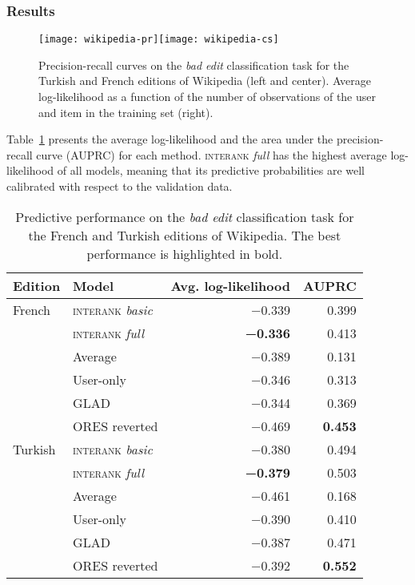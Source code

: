 \documentclass[format=sigconf]{acmart}
\begin{document}
\subsubsection{Results}

\begin{figure*}
\texttt{[image: wikipedia-pr]}\hfill\texttt{[image: wikipedia-cs]}
\caption{Precision-recall curves on the \emph{bad edit} classification task for the Turkish and French editions of Wikipedia (left and center).
Average log-likelihood as a function of the number of observations of the user and item in the training set (right).}
\label{fig:wikipr}
\end{figure*}

Table~\ref{tab:wikiperf} presents the average log-likelihood and the area under the precision-recall curve (AUPRC) for each method.
\textsc{interank} \emph{full} has the highest average log-likelihood of all models, meaning that its predictive probabilities are well calibrated with respect to the validation data.

\begin{table}
  \caption{Predictive performance on the \emph{bad edit} classification task for the French and Turkish editions of Wikipedia.
The best performance is highlighted in bold.}
  \label{tab:wikiperf}
  \begin{tabular}{llrr}
    \toprule
    Edition        & Model                          & Avg. log-likelihood   & AUPRC \\
    \midrule
    French         & \textsc{interank} \emph{basic} & \num{-0.339}          & \num{0.399}  \\
                   & \textsc{interank} \emph{full}  & \textbf{\num{-0.336}} & \num{0.413}  \\
    \addlinespace
                   & Average                        & \num{-0.389}          & \num{0.131}  \\
                   & User-only                      & \num{-0.346}          & \num{0.313}  \\
                   & GLAD                           & \num{-0.344}          & \num{0.369} \\
                   & ORES reverted                  & \num{-0.469}          & \textbf{\num{0.453}} \\
    \midrule
    Turkish        & \textsc{interank} \emph{basic} & \num{-0.380}          & \num{0.494}  \\
                   & \textsc{interank} \emph{full}  & \textbf{\num{-0.379}} & \num{0.503}  \\
    \addlinespace
                   & Average                        & \num{-0.461}          & \num{0.168}  \\
                   & User-only                      & \num{-0.390}          & \num{0.410}  \\
                   & GLAD                           & \num{-0.387}          & \num{0.471} \\
                   & ORES reverted                  & \num{-0.392}          & \textbf{\num{0.552}} \\
    \bottomrule
  \end{tabular}
\end{table}
\end{document}
